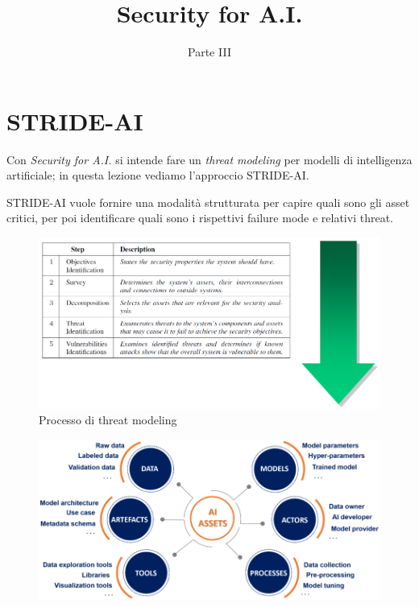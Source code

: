\documentclass{report}
\title{\huge\textbf{{Security for A.I.}}}
\date{Parte III}
\begin{document}
\maketitle
\tableofcontents
\newpage

\chapter{STRIDE-AI}

\noindent Con \textit{Security for A.I.} si intende fare un \textit{threat modeling} per modelli di intelligenza artificiale; in questa lezione 
vediamo l'approccio STRIDE-AI.

\noindent STRIDE-AI vuole fornire una modalità strutturata per capire quali sono gli asset critici, per poi identificare quali sono i rispettivi 
failure mode e relativi threat. 

\begin{figure}[H]
    \centering
    \includegraphics[width=1\linewidth]{images/threat-modeling.png}
    \caption{Processo di threat modeling}
\end{figure}

\begin{figure}[H]
    \centering
    \includegraphics[width=1\linewidth]{images/ai-assets.png}
\end{figure}
\end{document}
